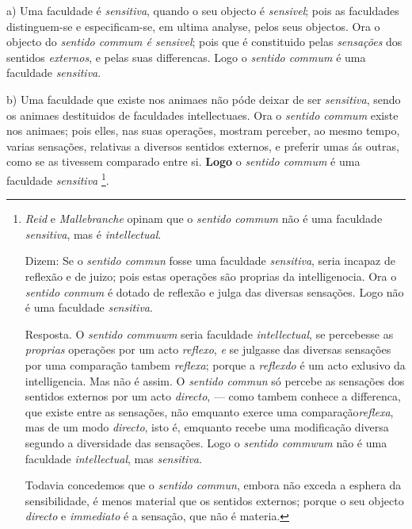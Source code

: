 

a) Uma faculdade é \emph{sensitiva}, quando o seu objecto é \emph{sensivel}; pois as faculdades distinguem-se e especificam-se, em ultima analyse, pelos seus objectos. Ora o objecto do \emph{sentido commum é sensivel}; pois que é constituido pelas \emph{sensações} dos sentidos \emph{externos}, e pelas suas differencas. Logo o \emph{sentido commum} é uma faculdade \emph{sensitiva}.

b) Uma faculdade que existe nos animaes não póde deixar de ser \emph{sensitiva}, sendo os animaes destituidos de faculdades intellectuaes. Ora o \emph{sentido commum} existe nos animaes; pois elles, nas suas operações, mostram perceber, ao mesmo tempo, varias sensações, relativas a diversos sentidos externos, e preferir umas ás outras, como se as tivessem comparado entre si. \textbf{Logo} o \emph{sentido commum} é uma faculdade \emph{sensitiva} \footnote{\emph{Reid} e \emph{Mallebranche} opinam que o \emph{sentido commum} não é uma faculdade \emph{sensitiva}, mas é \emph{intellectual}.\par Dizem: Se o \emph{sentido commun} fosse uma faculdade \emph{sensitiva}, seria incapaz de reflexão e de juizo; pois estas operações são proprias da intelligenocia. Ora o \emph{sentido conmum} é dotado de reflexão e julga das diversas sensações. Logo não é uma faculdade \emph{sensitiva}.\par Resposta. O \emph{sentido commuwm} seria faculdade \emph{intellectual}, se percebesse as \emph{proprias} operações por um acto \emph{reflexo}, \emph{e} se julgasse das diversas sensações por uma comparação tambem \emph{reflexa}; porque a \emph{reflexdo} é um acto exlusivo da intelligencia. Mas não é assim. O \emph{sentido commun} só percebe as sensações dos sentidos externos por um acto \emph{directo}, --- como tambem conhece a differenca, que existe entre as sensações, não emquanto exerce uma comparação\emph{reflexa}, mas de um modo \emph{directo}, isto é, emquanto recebe uma modificação diversa segundo a diversidade das sensações. Logo o \emph{sentido commwum} não é uma faculdade \emph{intellectual}, mas \emph{sensitiva}.\par Todavia concedemos que o \emph{sentido commun}, embora não exceda a esphera da sensibilidade, é menos material que os sentidos externos; porque o seu objecto \emph{directo} e \emph{immediato} é a sensação, que não é materia.}.


